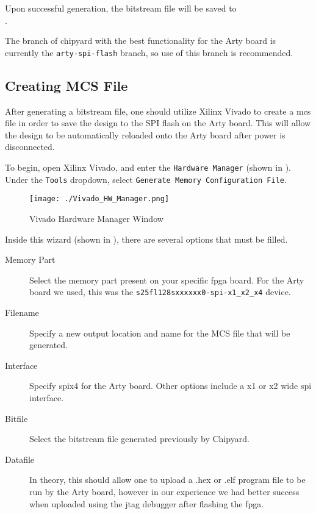 Upon successful generation, the bitstream file will be saved to \\ .

The branch of chipyard with the best functionality for the Arty board is currently the \texttt{arty-spi-flash} branch, so use of this branch is recommended.

\subsection{Creating MCS File}\label{sec:Creating_MCS_file}
After generating a bitstream file, one should utilize Xilinx Vivado to create a \gls{mcs} file in order to save the design to the SPI flash on the Arty board.
This will allow the design to be automatically reloaded onto the Arty board after power is disconnected.

To begin, open Xilinx Vivado, and enter the \texttt{Hardware Manager} (shown in ).
Under the \texttt{Tools} dropdown, select \texttt{Generate Memory Configuration File}.
\begin{figure}[h!tbp]
  \centering
  \texttt{[image: ./Vivado\_HW\_Manager.png]}
  \caption{Vivado Hardware Manager Window}
  \label{fig:Vivado_HW_Manager}
\end{figure}

Inside this wizard (shown in ), there are several options that must be filled.
\begin{description}
\item[Memory Part] Select the memory part present on your specific \Gls{fpga} board.
  For the Arty board we used, this was the \texttt{s25fl128sxxxxxx0-spi-x1\_x2\_x4} device.
\item[Filename] Specify a new output location and name for the MCS file that will be generated.
\item[Interface] Specify \Gls{spi}x4 for the Arty board. Other options include a x1 or x2 wide \Gls{spi} interface.
\item[Bitfile] Select the bitstream file generated previously by Chipyard.
\item[Datafile] In theory, this should allow one to upload a .hex or .elf program file to be run by the Arty board, however in our experience we had better success when uploaded using the \Gls{jtag} debugger after flashing the \Gls{fpga}.
\end{description}

